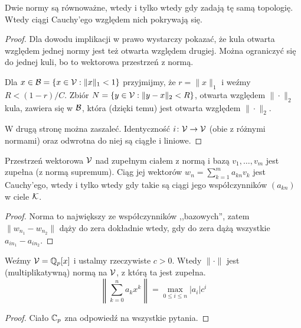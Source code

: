 \begin{fakt}
	Dwie normy są równoważne, wtedy i tylko wtedy gdy zadają tę samą topologię.
	Wtedy ciągi Cauchy'ego względem nich pokrywają się.
\end{fakt}

\begin{proof}
	Dla dowodu implikacji w prawo wystarczy pokazać, że kula otwarta względem jednej normy jest też otwarta względem drugiej.
	Można ograniczyć się do jednej kuli, bo to wektorowa przestrzeń z normą.

	Dla $x \in \mathcal B = \{x \in \mathcal V : \|x\|_1 < 1\}$ przyjmijmy, że $r = \|x\|_1$ i weźmy $R < (1-r) / C$.
	Zbiór $N = \{y \in \mathcal V : \|y-x\|_2 < R\}$, otwarta względem $\|\cdot\|_2$ kula, zawiera się w $\mathcal B$, która (dzięki temu) jest otwarta względem $\|\cdot\|_2$.

	W drugą stronę można zaszaleć.
	Identyczność $i \colon \mathcal V \to \mathcal V$ (obie z różnymi normami) oraz odwrotna do niej są ciągłe i liniowe.
\end{proof}

\begin{fakt}
	Przestrzeń wektorowa $\mathcal V$ nad zupełnym ciałem z normą i bazą $v_1, \ldots, v_m$ jest zupełna (z normą supremum).
	Ciąg jej wektorów $w_n = \sum_{k=1}^m a_{kn}v_k$ jest Cauchy'ego, wtedy i tylko wtedy gdy takie są ciągi jego współczynników $(a_{kn})$ w ciele $\mathcal K$.
\end{fakt}

\begin{proof}
	Norma to największy ze współczynników ,,bazowych'', zatem $\|w_{n_1} - w_{n_2}\|$ dąży do zera dokładnie wtedy, gdy do zera dążą wszystkie $a_{i n_1} - a_{i n_2}$.
\end{proof}

\begin{fakt}
	Weźmy $\mathcal V = \mathbb Q_p[x]$ i ustalmy rzeczywiste $c > 0$.
	Wtedy $\|\cdot\|$ jest (multiplikatywną) normą na $\mathcal V$, z którą ta jest zupełna.
	\[
		\left\|\sum_{k=0}^n a_k x^k \right\| = \max_{0 \le i \le n} |a_i| c^i
	\]
\end{fakt}

\begin{proof}
	Ciało $\mathbb C_p$ zna odpowiedź na wszystkie pytania.
\end{proof}